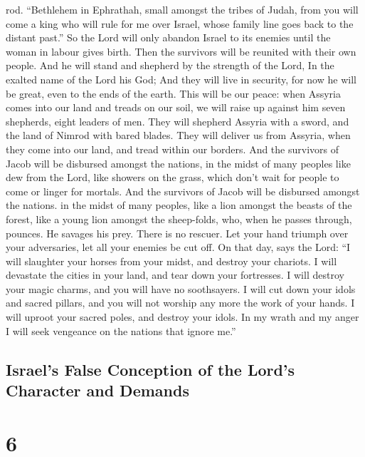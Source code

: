 rod.  ``Bethlehem in Ephrathah, small amongst the tribes of
Judah, from you will come a king who will rule for me over Israel, whose
family line goes back to the distant past.''  So the Lord
will only abandon Israel to its enemies until the woman in labour gives
birth. Then the survivors will be reunited with their own people.
 And he will stand and shepherd by the strength of the Lord,
In the exalted name of the Lord his God; And they will live in security,
for now he will be great, even to the ends of the earth. 
This will be our peace: when Assyria comes into our land and treads on
our soil, we will raise up against him seven shepherds, eight leaders of
men.  They will shepherd Assyria with a sword, and the land
of Nimrod with bared blades. They will deliver us from Assyria, when
they come into our land, and tread within our borders.  And
the survivors of Jacob will be disbursed amongst the nations, in the
midst of many peoples like dew from the Lord, like showers on the grass,
which don't wait for people to come or linger for mortals. 
And the survivors of Jacob will be disbursed amongst the nations. in the
midst of many peoples, like a lion amongst the beasts of the forest,
like a young lion amongst the sheep-folds, who, when he passes through,
pounces. He savages his prey. There is no rescuer.  Let your
hand triumph over your adversaries, let all your enemies be cut off.
 On that day, says the Lord: ``I will slaughter your horses
from your midst, and destroy your chariots.  I will
devastate the cities in your land, and tear down your fortresses.
 I will destroy your magic charms, and you will have no
soothsayers.  I will cut down your idols and sacred
pillars, and you will not worship any more the work of your hands.
 I will uproot your sacred poles, and destroy your idols.
 In my wrath and my anger I will seek vengeance on the
nations that ignore me.''

\hypertarget{israels-false-conception-of-the-lords-character-and-demands}{%
\subsection{Israel's False Conception of the Lord's Character and
Demands}\label{israels-false-conception-of-the-lords-character-and-demands}}

\hypertarget{section-4}{%
\section{6}\label{section-4}}

